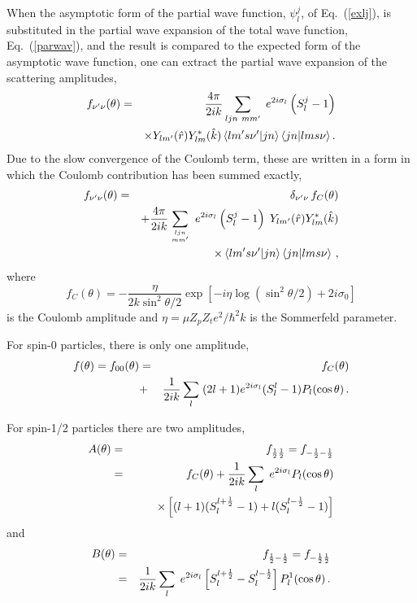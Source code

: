When the asymptotic form of the partial wave function, $\psi_{l}^{j}$, of
Eq.~(\ref{exlj}), is substituted in the partial wave expansion of the total
wave function, Eq.~(\ref{parwav}), and the result is compared to the
expected form of the asymptotic wave function, one can extract the partial
wave expansion of the scattering amplitudes,
\begin{eqnarray}
f_{\nu^{\prime}\nu}(\theta) &=& \frac{4\pi}{2ik}\sum_{{{{ljn}{\ mm^{\prime}}}%
}}\;e^{2i\sigma_{l}}\left(S_{l}^{j}-1\right) \notag \\
&& \times Y_{lm^{\prime}}(\hat{r})Y_{lm}^{*}(\hat{k})\left\langle
lm^{\prime}s\nu^{\prime}|jn\right\rangle \left\langle jn|lms\nu\right\rangle.
\end{eqnarray}
Due to the slow convergence of the Coulomb term, these are written in a form
in which the Coulomb contribution has been summed exactly,%
\begin{eqnarray}
f_{\nu^{\prime}\nu}(\theta) & = & \delta_{\nu^{\prime}\nu}\, f_{C}(\theta) \\
& & +\frac{4\pi}{2ik}\sum_{{{ljn\atop mm^{\prime}}}}\;
e^{2i\sigma_{l}}\left(S_{l}^{j}-1\right)\; Y_{lm^{\prime}}(\hat{r}%
)Y_{lm}^{*}(\hat{k})  \notag \\
& & \qquad\qquad\times\left\langle lm^{\prime}s\nu^{\prime}|jn\right\rangle
\left\langle jn|lms\nu\right\rangle \,,  \notag
\end{eqnarray}
where
\begin{equation}
f_{C}(\theta)=-\frac{\eta}{2k\sin^{2}\theta/2}\exp\left[-i\eta\log\left(%
\sin^{2}\theta/2\right)+2i\sigma_{0}\right]
\end{equation}
is the Coulomb amplitude and $\eta=\mu Z_p Z_t e^2/\hbar^2 k $ is the
Sommerfeld parameter.

For spin-0 particles, there is only one amplitude,
\begin{eqnarray}
f(\theta)=f_{00}(\theta) & = & f_{C}(\theta) \\
& + & \frac{1}{2ik}\sum_{l}\;(2l+1)e^{2i\sigma_{l}}(S_{l}^{l}-1)P_{l}(\cos%
\theta)\,.  \notag
\end{eqnarray}

For spin-1/2 particles there are two amplitudes,
\begin{eqnarray}
A(\theta) & = & f_{\frac{1}{2}\frac{1}{2}}=f_{-\frac{1}{2}-\frac{1}{2}} \\
& = & f_{C}(\theta)+\frac{1}{2ik}\sum_{l}\; e^{2i\sigma_{l}}P_{l}(\cos\theta)
\notag \\
& & \qquad\times\left[(l+1)(S_{l}^{l+\frac{1}{2}}-1)+l(S_{l}^{l-\frac{1}{2}%
}-1)\right]  \notag
\end{eqnarray}
and
\begin{eqnarray}
B(\theta) & = & f_{\frac{1}{2}-\frac{1}{2}}=f_{-\frac{1}{2}\frac{1}{2}} \\
& = & \frac{1}{2ik}\sum_{l}\; e^{2i\sigma_{l}}\left[S_{l}^{l+\frac{1}{2}%
}-S_{l}^{l-\frac{1}{2}}\right]P_{l}^{1}(\cos\theta)\,.  \notag
\end{eqnarray}

